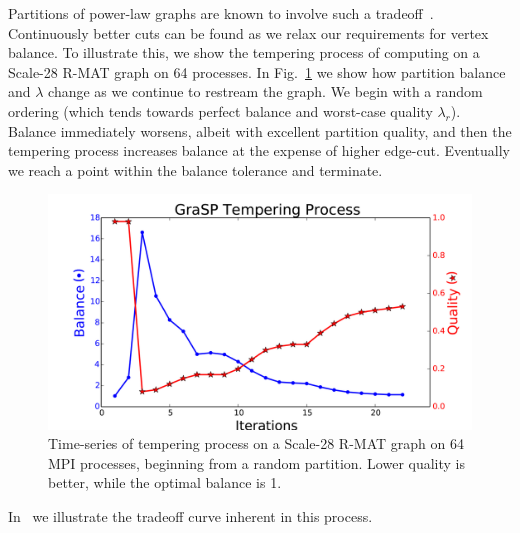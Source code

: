 Partitions of power-law graphs are known to involve such a tradeoff~\cite{Lang04findinggood}. Continuously better cuts can be found as we relax our requirements for vertex balance. To illustrate this, we show the tempering process of \ourmethod computing on a Scale-28 R-MAT graph on 64 processes. In Fig.~\ref{fig:process} we show how partition balance and $\lambda$ change as we continue to restream the graph. We begin with a random ordering (which tends towards perfect balance and worst-case quality $\lambda_r$). Balance immediately worsens, albeit with excellent partition quality, and then the tempering process increases balance at the expense of higher edge-cut. Eventually we reach a point within the balance tolerance and terminate.

\begin{figure}[t!]
\centering
\includegraphics[width=0.9\columnwidth] {figures/tradeoff_process.pdf}
\caption[Caption for]{ Time-series of tempering process on a Scale-28 R-MAT graph on 64 MPI processes, beginning from a random partition. Lower quality is better, while the optimal balance is 1. }
\label{fig:process}
\end{figure}

In~ we illustrate the tradeoff curve inherent in this process.

